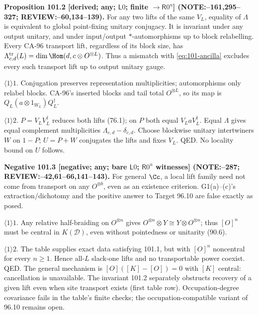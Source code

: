 \textbf{Proposition 101.2 [derived; any; \(\mathsf L0\); finite \(\to\mathsf R0^u\)] (NOTE:--161,295--327; REVIEW:--60,134--139).}
For any two lifts of the same \(V_L\), equality of \(\Lambda\) is equivalent to global point-fixing unitary conjugacy.
It is invariant under any output unitary, and under input/output \(*\)-automorphisms up to block relabelling.
Every CA-96 transport lift, regardless of its block size, has
\(\Lambda^{\rm tr}_{c,d}(L)=\dim\Hom(d,c\otimes O^{\otimes L})\).
Thus a mismatch with \eqref{eq:101-ancilla} excludes every such transport lift up to output unitary gauge.
\par\(\langle1\rangle1\). Conjugation preserves representation multiplicities; automorphisms only relabel blocks.
CA-96's inserted blocks and tail total \(O^{\otimes L}\), so its map is \(Q_L(a\otimes1_{W_L})Q_L^\dagger\).
\par\(\langle1\rangle2\). \(P=V_LV_L^\dagger\) reduces both lifts (76.1); on \(P\) both equal \(V_LaV_L^\dagger\).
Equal \(\Lambda\) gives equal complement multiplicities \(\Lambda_{c,d}-\delta_{c,d}\). Choose blockwise unitary
intertwiners \(W\) on \(1-P\); \(U=P+W\) conjugates the lifts and fixes \(V_L\). QED. No locality bound on \(U\) follows.

\textbf{Negative 101.3 [negative; any; bare \(\mathsf L0\); \(\mathsf R0^u\) witnesses] (NOTE:--287; REVIEW:--42,61--66,141--143).}
For general \(\Cc\), a local lift family need not come from transport on any \(O^{\otimes b}\), even as an existence
criterion. G1(a)--(c)'s extraction/dichotomy and the positive answer to Target 96.10 are false exactly as posed.
\par\(\langle1\rangle1\). Any relative half-braiding on \(O^{\otimes n}\) gives \(O^{\otimes n}\otimes Y\cong Y\otimes O^{\otimes n}\);
thus \([O]^n\) must be central in \(K(\mathcal D)\), even without pointedness or unitarity (90.6).
\par\(\langle1\rangle2\). The table supplies exact data satisfying 101.1, but with \([O]^n\) noncentral for every \(n\ge1\).
Hence all-\(L\) slack-one lifts and no transportable power coexist. QED.
The general mechanism is \([O]([K]-[O])=0\) with \([K]\) central: cancellation is unavailable.
The invariant 101.2 separately obstructs recovery of a given lift even when site transport exists (first table row).
Occupation-degree covariance fails in the table's finite checks; the occupation-compatible variant of 96.10 remains open.

